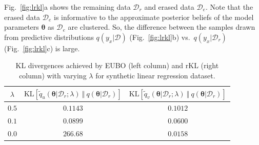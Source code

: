 \documentclass{article}
\theoremstyle{definition}
\newcommand{\mcl}[1]{\mathcal{#1}}
\newcommand{\da}{\mcl{D}}
\newcommand{\dc}{\mcl{D}_r}
\newcommand{\dr}{\mcl{D}_e}
\newcommand{\eubo}{\tilde{q}_u}
\newcommand{\elbo}{\tilde{q}_v}
\begin{document}
Fig.~\ref{fig:lrkl}a shows the remaining data $\dc$ and erased data $\dr$. Note that the erased data $\dr$ is informative to the approximate posterior beliefs of the model parameters $\bm{\theta}$ as $\dr$ are clustered. So, the difference between the samples drawn from predictive distributions $q(y_x| \da)$ (Fig.~\ref{fig:lrkl}b) vs.~$q(y_x| \dc)$ (Fig.~\ref{fig:lrkl}c) is large.
%
\begin{table}[h]
\centering
\caption{KL divergences achieved by EUBO (left column) and rKL (right column) with varying $\lambda$ for synthetic linear regression dataset.}
\begin{tabular}{ccc}
\toprule
$\lambda$ & $\text{KL}[\eubo(\bm{\theta}|\dc;\lambda)\ \Vert\ q(\bm{\theta}|\dc)]$ & $\text{KL}[\elbo(\bm{\theta}|\dc;\lambda)\ \Vert\ q(\bm{\theta}|\dc)]$\\
\midrule
$0.5$ & $0.1143$ & $0.1012$\\
$0.1$ & $0.0899$ & $0.0600$\\
$0.0$ & $266.68$ & $0.0158$\\
\bottomrule
\end{tabular}
\label{tbl:lrkl}
\end{table}
%
\end{document}
